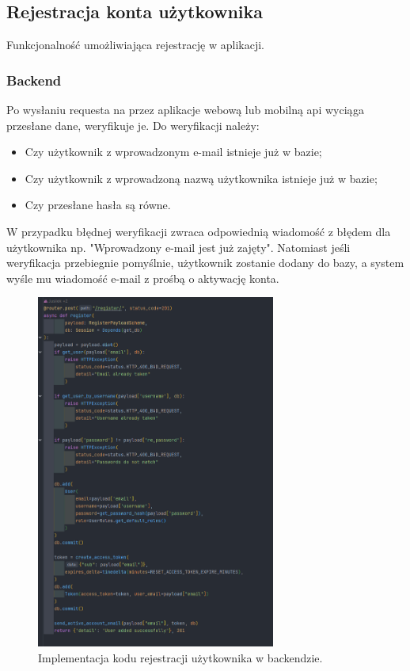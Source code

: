 
\subsection{Rejestracja konta użytkownika}
Funkcjonalność umożliwiająca rejestrację w aplikacji.

\subsubsection{Backend}
Po wysłaniu requesta na przez aplikacje webową lub mobilną api wyciąga przesłane dane, weryfikuje je. Do weryfikacji należy:

\begin{itemize}
    \item Czy użytkownik z wprowadzonym e-mail istnieje już w bazie;
    \item Czy użytkownik z wprowadzoną nazwą użytkownika istnieje już w bazie;
    \item Czy przesłane hasła są równe.
\end{itemize}

W przypadku błędnej weryfikacji zwraca odpowiednią wiadomość z błędem dla użytkownika np. "Wprowadzony e-mail jest już zajęty". Natomiast jeśli weryfikacja przebiegnie pomyślnie, użytkownik zostanie dodany do bazy, a system wyśle mu wiadomość e-mail z prośbą o aktywację konta.

\begin{figure}[H]
    \centering
    \includegraphics[width=0.7\textwidth]{chapters/chapter_8/screens/rejestracja_backend}
    \caption{Implementacja kodu rejestracji użytkownika w backendzie.}
    \label{img:rejestracja_backend}
\end{figure}

